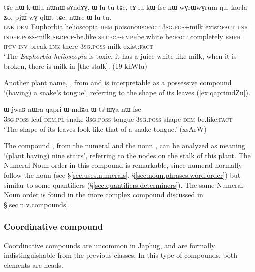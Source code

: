 \begin{exe}
\ex \label{ex:khWlu} 
\gll tɕe nɯ kʰɯlu nɯnɯ sɤndɤɣ. ɯ-lu tu tɕe, tɤ-lu kɯ-fse kɯ-wɣrɯ\redp{}wɣrum ŋu. koŋla ʑo, pjɯ́-wɣ-qlɯt tɕe, nɯre ɯ-lu tu.\\
\textsc{lnk} \textsc{dem} Euphorbia.helioscopia \textsc{dem} poisonous:\textsc{fact} \textsc{3sg}.\textsc{poss}-milk exist:\textsc{fact} \textsc{lnk} \textsc{indef}.\textsc{poss}-milk \textsc{sbj}:\textsc{pcp}-be.like \textsc{sbj}:\textsc{pcp}-\textsc{emph}\redp{}be.white be:\textsc{fact} completely \textsc{emph} \textsc{ipfv}-\textsc{inv}-break \textsc{lnk} there \textsc{3sg}.\textsc{poss}-milk exist:\textsc{fact}\\
\glt `The \textit{Euphorbia helioscopia} is toxic, it has a juice white like milk, when it is broken, there is milk in [the stalk]. (19-khWlu)
\end{exe}

Another plant name, \textit{}, from  and  is interpretable as a possessive compound `(having) a snake's tongue', referring to the shape of its leaves (\ref{ex:qaprimdZu}).

\begin{exe}
	\ex \label{ex:qaprimdZu} 
	\gll ɯ-jwaʁ nɯra qapri ɯ-mdʑu ɯ-tsʰɯɣa nɯ fse \\
	\textsc{3sg}.\textsc{poss}-leaf \textsc{dem}:\textsc{pl} snake \textsc{3sg}.\textsc{poss}-tongue \textsc{3sg}.\textsc{poss}-shape \textsc{dem} be.like:\textsc{fact} \\
	\glt `The shape of its leaves look like that of a snake tongue.' (xsArW) 
\end{exe}



The compound \textit{}, from the numeral  and the noun , can be analyzed as meaning `(plant having) nine stairs', referring to the nodes on the stalk of this plant. The Numeral-Noun order in this compound is remarkable, since numeral normally follow the noun (see §\ref{sec:uses.numerals}, §\ref{sec:noun.phrases.word.order}) but similar to some quantifiers (§\ref{sec:quantifiers.determiners}). The same Numeral-Noun order is found in the more complex compound \textit{} discussed in §\ref{sec.n.v.compounds}.


\subsubsection{Coordinative compound} \label{sec:coordinative.n.n}
Coordinative compounds are uncommon in Japhug, and are formally indistinguishable from the previous classes. In this type of compounds, both elements are heads.

